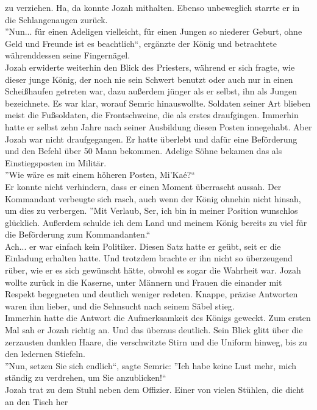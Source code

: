 zu verziehen. Ha, da konnte Jozah mithalten. Ebenso unbeweglich starrte er in die Schlangenaugen 
zurück.\\ 
''Nun... für einen Adeligen vielleicht, für einen Jungen so niederer Geburt, ohne Geld und Freunde 
ist es beachtlich``, ergänzte der König und betrachtete währenddessen seine Fingernägel.\\
Jozah erwiderte weiterhin den Blick des Priesters, während er sich fragte, wie dieser junge König, 
der noch nie sein Schwert benutzt oder auch nur in einen Scheißhaufen getreten war, dazu außerdem 
jünger als er selbst, ihn als Jungen bezeichnete. Es war klar, worauf Semric hinauswollte. Soldaten 
seiner Art blieben meist die Fußsoldaten, die Frontschweine, die als erstes draufgingen. Immerhin 
hatte er selbst zehn Jahre nach seiner Ausbildung diesen Posten innegehabt. Aber Jozah war nicht 
draufgegangen. Er hatte überlebt und dafür eine Beförderung und den Befehl über 50 Mann bekommen. 
Adelige Söhne bekamen das als Einstiegsposten im Militär.\\
''Wie wäre es mit einem höheren Posten, Mi'Kaé?``\\
Er konnte nicht verhindern, dass er einen Moment überrascht aussah. Der Kommandant verbeugte sich 
rasch, auch wenn der König ohnehin nicht hinsah, um dies zu verbergen. ''Mit Verlaub, Ser, ich bin 
in meiner Position wunschlos glücklich. Außerdem schulde ich dem Land und meinem König bereits zu 
viel für die Beförderung zum Kommandanten.``\\
Ach... er war einfach kein Politiker. Diesen Satz hatte er geübt, seit er die Einladung erhalten 
hatte. Und trotzdem brachte er ihn nicht so überzeugend rüber, wie er es sich gewünscht hätte, 
obwohl es sogar die Wahrheit war. Jozah wollte zurück in die Kaserne, unter Männern und Frauen die 
einander mit Respekt begegneten und deutlich weniger redeten. Knappe, präzise Antworten waren ihm 
lieber, und die Sehnsucht nach seinem Säbel stieg.\\
Immerhin hatte die Antwort die Aufmerksamkeit des Königs geweckt. Zum ersten Mal sah er Jozah 
richtig an. Und das überaus deutlich. Sein Blick glitt über die zerzausten dunklen Haare, die 
verschwitzte Stirn und die Uniform hinweg, bis zu den ledernen Stiefeln. \\
''Nun, setzen Sie sich endlich``, sagte Semric: ''Ich habe keine Lust mehr, mich ständig zu 
verdrehen, um Sie anzublicken!``\\
Jozah trat zu dem Stuhl neben dem Offizier. Einer von vielen Stühlen, die dicht an den Tisch her 
